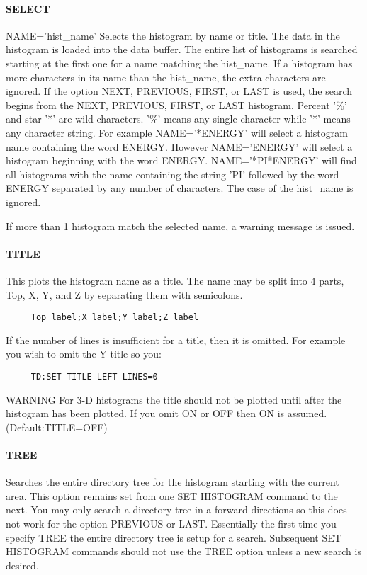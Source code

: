 \paragraph{SELECT}
NAME='hist\_name' Selects the histogram by name or title.  The data in
the histogram is loaded into the data buffer.   The  entire  list  of
histograms  is searched starting at the first one for a name matching
the hist\_name.  If a histogram has more characters in its  name  than
the hist\_name, the extra characters are ignored.  If the option NEXT,
PREVIOUS, FIRST, or LAST is used, the search begins  from  the  NEXT,
PREVIOUS,  FIRST,  or  LAST  histogram.  Percent '\%' and star '*' are
wild characters.  '\%' means any single character while '*' means  any
character string.  For example NAME='*ENERGY' will select a histogram
name containing the word ENERGY.  However NAME='ENERGY' will select a
histogram  beginning  with  the  word ENERGY.  NAME='*PI*ENERGY' will
find all histograms with the name containing the string 'PI' followed
by  the  word ENERGY separated by any number of characters.  The case
of the hist\_name is ignored.  

If  more  than 1 histogram match the selected name, a warning message
is issued.  
\paragraph{TITLE}
This plots the histogram name as a title.  The name may be split into
4 parts, Top, X, Y, and Z by separating them with semicolons.  
\begin{verbatim}
     Top label;X label;Y label;Z label 
\end{verbatim}
If  the  number  of  lines  is  insufficient  for a title, then it is
omitted.  For example you wish to omit the Y title so you:  
\begin{verbatim}
     TD:SET TITLE LEFT LINES=0 
\end{verbatim}

WARNING  For  3-D  histograms  the  title should not be plotted until
after the histogram has been plotted.  If you omit ON or OFF then  ON
is assumed.  
(Default:TITLE=OFF) 
\paragraph{TREE}
Searches  the  entire  directory tree for the histogram starting with
the current area.  This option remains set  from  one  SET  HISTOGRAM
command  to  the  next.   You  may  only search a directory tree in a
forward directions so this does not work for the option  PREVIOUS  or
LAST.   Essentially  the  first  time  you  specify  TREE  the entire
directory tree is setup  for  a  search.   Subsequent  SET  HISTOGRAM
commands  should  not  use  the  TREE  option  unless a new search is
desired.  
